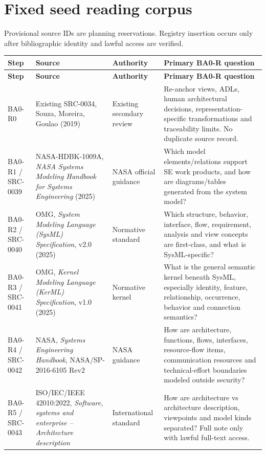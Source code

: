 \documentclass[11pt,a4paper]{article}
\begin{document}
\section{Fixed seed reading corpus}
Provisional source IDs are planning reservations. Registry insertion occurs only after bibliographic identity and lawful access are verified.
\begingroup\small\setlength{\tabcolsep}{3pt}\renewcommand{\arraystretch}{1.12}
\begin{longtable}{p{1.45cm}p{4.3cm}p{2.3cm}p{5.8cm}}
\toprule
\textbf{Step} & \textbf{Source} & \textbf{Authority} & \textbf{Primary BA0-R question}\\\midrule\endfirsthead
\toprule\textbf{Step} & \textbf{Source} & \textbf{Authority} & \textbf{Primary BA0-R question}\\\midrule\endhead\bottomrule\endfoot
BA0-R0 & Existing SRC-0034, Souza, Moreira, Goulao (2019) & Existing secondary review & Re-anchor views, ADLs, human architectural decisions, representation-specific transformations and traceability limits. No duplicate source record.\\
BA0-R1 / SRC-0039 & NASA-HDBK-1009A, \emph{NASA Systems Modeling Handbook for Systems Engineering} (2025) & NASA official guidance & Which model elements/relations support SE work products, and how are diagrams/tables generated from the system model?\\
BA0-R2 / SRC-0040 & OMG, \emph{System Modeling Language (SysML) Specification}, v2.0 (2025) & Normative standard & Which structure, behavior, interface, flow, requirement, analysis and view concepts are first-class, and what is SysML-specific?\\
BA0-R3 / SRC-0041 & OMG, \emph{Kernel Modeling Language (KerML) Specification}, v1.0 (2025) & Normative kernel & What is the general semantic kernel beneath SysML, especially identity, feature, relationship, occurrence, behavior and connection semantics?\\
BA0-R4 / SRC-0042 & NASA, \emph{Systems Engineering Handbook}, NASA/SP-2016-6105 Rev2 & NASA guidance & How are architecture, functions, flows, interfaces, resource-flow items, communication resources and technical-effort boundaries modeled outside security?\\
BA0-R5 / SRC-0043 & ISO/IEC/IEEE 42010:2022, \emph{Software, systems and enterprise -- Architecture description} & International standard & How are architecture vs architecture description, viewpoints and model kinds separated? Full note only with lawful full-text access.\\

\end{longtable}
\end{document}
